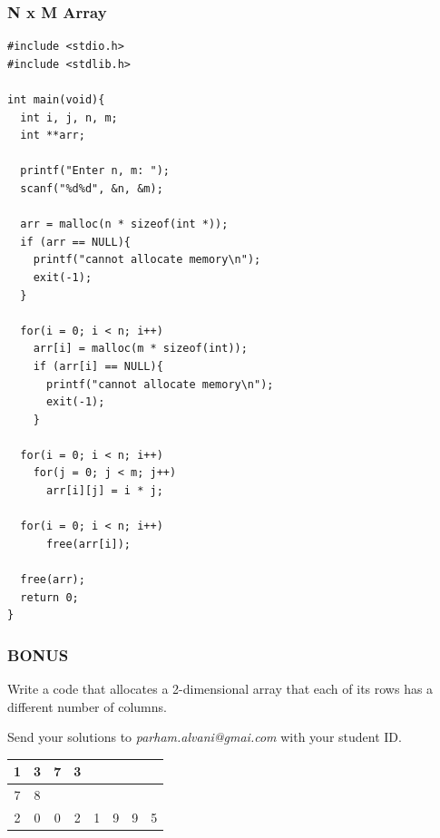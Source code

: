 \documentclass{../c-lecture}
\begin{document}
\begin{frame}[fragile]
  \frametitle{N x M Array}
  \tiny
  \begin{verbatim}
#include <stdio.h>
#include <stdlib.h>

int main(void){
  int i, j, n, m;
  int **arr;

  printf("Enter n, m: ");
  scanf("%d%d", &n, &m);

  arr = malloc(n * sizeof(int *));
  if (arr == NULL){
    printf("cannot allocate memory\n");
    exit(-1);
  }

  for(i = 0; i < n; i++)
    arr[i] = malloc(m * sizeof(int));
    if (arr[i] == NULL){
      printf("cannot allocate memory\n");
      exit(-1);
    }

  for(i = 0; i < n; i++)
    for(j = 0; j < m; j++)
      arr[i][j] = i * j;

  for(i = 0; i < n; i++)
      free(arr[i]);

  free(arr);
  return 0;
}
  \end{verbatim}
\end{frame}

\begin{frame}
  \frametitle{BONUS 💯}
  \begin{block}{}
    Write a code that allocates a 2-dimensional array that each of its rows has
    a different number of columns.
  \end{block}
  \begin{block}{}
    Send your solutions to
    \textit{\color{Orange} parham.alvani@gmai.com} with your student ID.
  \end{block}
  \begin{table}
  \begin{tabular}{*{8}{c}}
    \toprule
      1 &
      3 &
      7 &
      3 &
      \multicolumn{4}{c}{} \\
    \midrule
      7 &
      8 &
      \multicolumn{6}{c}{} \\
    \midrule
      2 &
      0 &
      0 &
      2 &
      1 &
      9 &
      9 &
      5 \\
    \bottomrule
  \end{tabular}
  \end{table}
\end{frame}
\end{document}
